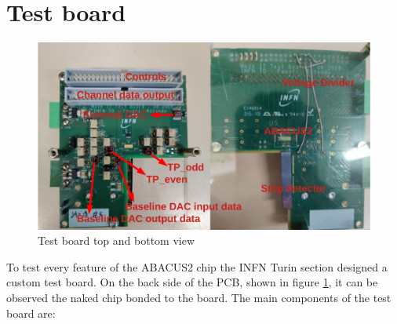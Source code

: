 \section{Test board}\label{testboard}
\begin{figure}[H]
	\centering
	\includegraphics[width=0.9\linewidth]{IMG/ch5/TESTBOARD}
	\caption{Test board top and bottom view}
	\label{fig:testboard}
\end{figure}
To test every feature of the ABACUS2 chip the INFN Turin section designed a custom test board.
On the back side of the PCB, shown in figure \ref{fig:testboard}, it can be observed the naked chip bonded to the board.
The main components of the test board are:
